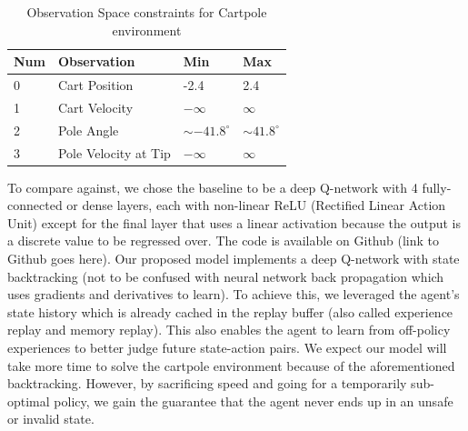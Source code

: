 \documentclass[acmsmall,review,authorversion]{acmart}
\begin{document}
\begin{table}[hbt]
\begin{tabular}{|l|l|l|l|}
\hline
Num & Observation & Min & Max  \\ \hline
0 & Cart Position & -2.4 & 2.4 \\ \hline
1   & Cart Velocity & $-\infty$ & $\infty$ \\ \hline
2   & Pole Angle & $\sim -41.8^\circ$ & $\sim41.8^\circ$ \\ \hline
3   & Pole Velocity at Tip & $-\infty$ & $\infty$ \\ \hline
\end{tabular} 
\caption{Observation Space constraints for Cartpole environment}
\label{tab:cartpole}
\end{table}
To compare against, we chose the baseline to be a deep Q-network with 4 fully-connected or dense layers, each with non-linear ReLU (Rectified Linear Action Unit) except for the final layer that uses a linear activation because the output is a discrete value to be regressed over. The code is available on Github (link to Github goes here). Our proposed model implements a deep Q-network with state backtracking (not to be confused with neural network back propagation which uses gradients and derivatives to learn). To achieve this, we leveraged the agent's state history which is already cached in the replay buffer (also called experience replay and memory replay). This also enables the agent to learn from off-policy experiences to better judge future state-action pairs. We expect our model will take more time to solve the cartpole environment because of the aforementioned backtracking. However, by sacrificing speed and going for a temporarily sub-optimal policy, we gain the guarantee that the agent never ends up in an unsafe or invalid state.
\end{document}
